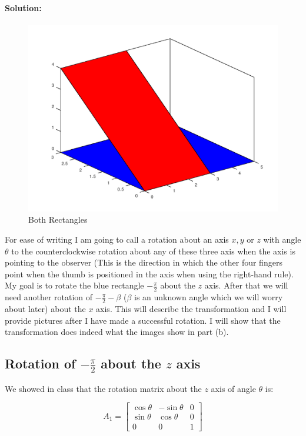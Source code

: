 \documentclass[12pt, letterpaper]{article}
\theoremstyle{statement}
\theoremstyle{statement}
\newenvironment{Solution}{\noindent\ignorespaces\paragraph{Solution:}}{\hfill \ding{122}\par\noindent}
\begin{document}
\begin{Solution}
    \begin{figure}[H]
        \centering
        \includegraphics[scale=0.5]{box3.png}
        \caption{Both Rectangles}
        \label{fig:fig3}
    \end{figure}
    
    For ease of writing I am going to call a rotation about an axis $x, y$ or $z$ with angle $\theta$ to the counterclockwise rotation about any of these three axis when the axis is pointing to the observer (This is the direction in which the other four fingers point when the thumb is positioned in the axis when using the right-hand rule). My goal is to rotate the blue rectangle $-\frac{\pi}{2}$ about the $z$ axis. After that we will need another rotation of $-\frac{\pi}{2}-\beta$ ($\beta$ is an unknown angle which we will worry about later) about the $x$ axis. This will describe the transformation and I will provide pictures after I have made a successful rotation. I will show that the transformation does indeed what the images show in part (b).
    
    \subsection*{Rotation of $-\frac{\pi}{2}$ about the $z$ axis}
    
    We showed in class that the rotation matrix about the $z$ axis of angle $\theta$ is:
    
    $$
    A_1=
    \begin{bmatrix}
    \cos{\theta} & -\sin{\theta} & 0 \\
    \sin{\theta} & \cos{\theta} & 0 \\
    0 & 0 & 1
    \end{bmatrix}
    $$
    

\end{Solution}
\end{document}
